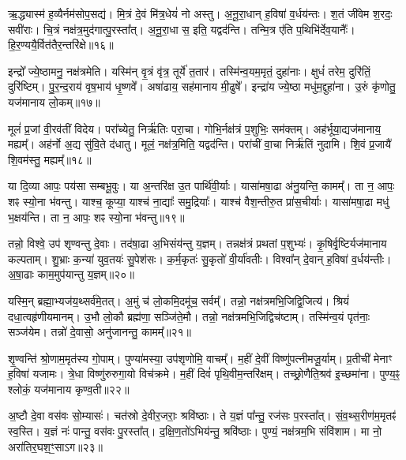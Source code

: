 ऋ॒द्ध्यास्म॑ ह॒व्यैर्नम॑सोप॒सद्य॑। 
मि॒त्रं दे॒वं मि॑त्र॒धेयं॑ नो अस्तु। 
अ॒नू॒रा॒धान् ह॒विषा॑ व॒र्धय॑न्तः। 
श॒तं जी॑वेम श॒रदः॒ सवी॑राः। 
चि॒त्रं नक्ष॑त्र॒मुद॑गात्पु॒रस्ता᳚त्। 
अ॒नू॒रा॒धा स॒ इति॒ यद्वद॑न्ति। 
तन्मि॒त्र ए॑ति प॒थिभि॑र्देव॒यानैः᳚। 
हि॒र॒ण्ययै॒र्वित॑तै\-र॒न्तरि॑क्षे॥१६॥ 

इन्द्रो᳚ ज्ये॒ष्ठामनु॒ नक्ष॑त्रमेति। 
यस्मि॑न् वृ॒त्रं वृ॑त्र॒ तूर्ये॑ त॒तार॑। 
तस्मि॑न्व॒यम॒मृतं॒ दुहा॑नाः। 
क्षुधं॑ तरेम॒ दुरि॑तिं॒ दुरि॑ष्टिम्। 
पु॒र॒न्द॒राय॑ वृष॒भाय॑ धृ॒ष्णवे᳚। 
अषा॑ढाय॒ सह॑मानाय मी॒ढुषे᳚। 
इन्द्रा॑य ज्ये॒ष्ठा मधु॑म॒द्दुहा॑ना। 
उ॒रुं कृ॑णोतु॒ यज॑मानाय लो॒कम्॥१७॥ 

मूलं॑ प्र॒जां वी॒रव॑तीं विदेय। 
परा᳚च्येतु॒ निर्ऋ॑तिः परा॒चा। 
गोभि॒र्नक्ष॑त्रं प॒शुभिः॒ सम॑क्तम्। 
अह॑र्भूया॒द्यज॑मानाय॒ मह्यम्᳚। 
अह॑र्नो अ॒द्य सु॑वि॒ते द॑धातु। 
मूलं॒ नक्ष॑त्र॒मिति॒ यद्वद॑न्ति। 
परा॑चीं वा॒चा निर्ऋ॑तिं नुदामि। 
शि॒वं प्र॒जायै॑ शि॒वम॑स्तु॒ मह्यम्᳚॥१८॥ 

या दि॒व्या आपः॒ पय॑सा सम्बभू॒वुः। 
या अ॒न्तरि॑क्ष उ॒त पार्थि॑वी॒र्याः। 
यासा॑मषा॒ढा अ॑नु॒यन्ति॒ कामम्᳚। 
ता न॒ आपः॒ शꣴ स्यो॒ना भ॑वन्तु। 
याश्च॒ कूप्या॒ याश्च॑ ना॒द्याः᳚ समु॒द्रियाः᳚। 
याश्च॑ वैश॒न्तीरु॒त प्रा॑स॒चीर्याः। 
यासा॑मषा॒ढा मधु॑ भ॒क्षय॑न्ति। 
ता न॒ आपः॒ शꣴ स्यो॒ना भ॑वन्तु॥१९॥ 

तन्नो॒ विश्वे॒ उप॑ शृण्वन्तु दे॒वाः। 
तद॑षा॒ढा अ॒भिसंय॑न्तु य॒ज्ञम्। 
तन्नक्ष॑त्रं प्रथतां प॒शुभ्यः॑। 
कृ॒षिर्वृ॒ष्टिर्यज॑मानाय कल्पताम्। 
शु॒भ्राः क॒न्या॑ युव॒तयः॑ सु॒पेश॑सः। 
क॒र्म॒कृतः॑ सु॒कृतो॑ वी॒र्या॑वतीः। 
विश्वा᳚न् दे॒वान् ह॒विषा॑ व॒र्धय॑न्तीः। 
अ॒षा॒ढाः काम॒मुप॑यान्तु य॒ज्ञम्॥२०॥ 

यस्मि॒न् ब्रह्मा॒भ्यज॑य॒थ्सर्व॑मे॒तत्। 
अ॒मुं च॑ लो॒कमि॒दमू॑च॒ सर्वम्᳚। 
तन्नो॒ नक्ष॑त्रमभि॒जिद्वि॒जित्य॑। 
श्रियं॑ दधा॒त्वहृ॑णीय\-मानम्। 
उ॒भौ लो॒कौ ब्रह्म॑णा॒ सञ्जि॑ते॒मौ। 
तन्नो॒ नक्ष॑त्रमभि॒जिद्विच॑ष्टाम्। 
तस्मि॑न्व॒यं पृत॑नाः॒ सञ्ज॑येम। 
तन्नो॑ दे॒वासो॒ अनु॑जानन्तु॒ कामम्᳚॥२१॥ 

शृ॒ण्वन्ति॑ श्रो॒णाम॒मृत॑स्य गो॒पाम्। 
पुण्या॑मस्या॒ उप॑शृणोमि॒ वाचम्᳚। 
म॒हीं दे॒वीं विष्णु॑पत्नीमजू॒र्याम्। 
प्र॒तीची॑ मेनाꣳ ह॒विषा॑ यजामः। 
त्रे॒धा विष्णु॑रुरुगा॒यो विच॑क्रमे। 
म॒हीं दिवं॑ पृथि॒वीम॒न्तरि॑क्षम्। 
तच्छ्रो॒णैति॒श्रव॑ इ॒च्छमा॑ना। 
पुण्य॒ꣴ॒ श्लोकं॒ यज॑मानाय कृण्व॒ती॥२२॥ 

अ॒ष्टौ दे॒वा वस॑वः सो॒म्यासः॑। 
चत॑स्रो दे॒वीर॒जराः॒ श्रवि॑ष्ठाः। 
ते य॒ज्ञं पा᳚न्तु॒ रज॑सः प॒रस्ता᳚त्। 
सं॒व॒थ्स॒रीण॑म॒मृतꣴ॑ स्व॒स्ति। 
य॒ज्ञं नः॑ पान्तु॒ वस॑वः पु॒रस्ता᳚त्। 
द॒क्षि॒ण॒तो॑ऽभिय॑न्तु॒ श्रवि॑ष्ठाः। 
पुण्यं॒ नक्ष॑त्रम॒भि संवि॑शाम। 
मा नो॒ अरा॑तिर॒घश॒ꣳ॒साऽग\snn{}॥२३॥ 

